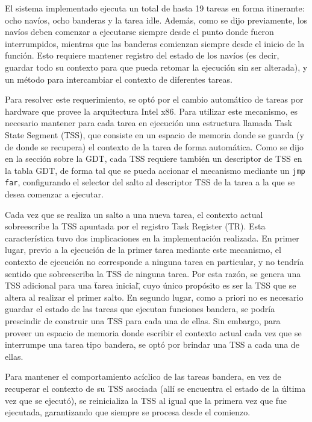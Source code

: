 	El sistema implementado ejecuta un total de hasta 19 tareas en forma itinerante: 
ocho navíos, ocho banderas y la tarea idle. Además, como se dijo previamente, 
los navíos deben comenzar a ejecutarse siempre desde el punto donde fueron interrumpidos, 
mientras que las banderas comienzan siempre desde el inicio de la función. Esto requiere 
mantener registro del estado de los navíos (es decir, guardar todo su contexto para que 
pueda retomar la ejecución sin ser alterada), y un método para intercambiar el contexto 
de diferentes tareas.

	Para resolver este requerimiento, se optó por el cambio automático 
de tareas por hardware que provee la arquitectura Intel x86. Para utilizar este mecanismo, 
es necesario mantener para cada tarea en ejecución una estructura llamada Task State 
Segment (TSS), que consiste en un espacio de memoria donde se guarda (y de donde se 
recupera) el contexto de la tarea de forma automática. Como se dijo en la sección sobre la GDT, 
cada TSS requiere también un descriptor de TSS en la tabla GDT, de forma tal que se pueda 
accionar el mecanismo mediante un \texttt{jmp far}, configurando el selector del salto 
al descriptor TSS de la tarea a la que se desea comenzar a ejecutar.

	Cada vez que se realiza un salto a una nueva tarea, el contexto actual sobreescribe 
la TSS apuntada por el registro Task Register (TR). Esta característica tuvo dos implicaciones 
en la implementación realizada. En primer lugar, previo a la ejecución de la primer tarea 
mediante este mecanismo, el contexto de ejecución no corresponde a ninguna tarea en particular, y 
no tendría sentido que sobreescriba la TSS de ninguna tarea. Por esta razón, se genera una 
TSS adicional para una \"tarea inicial\", cuyo único propósito es ser la TSS que se altera 
al realizar el primer salto. En segundo lugar, como a priori no es necesario guardar el estado de las tareas que ejecutan funciones bandera, se podría prescindir de construir una TSS para cada 
una de ellas. Sin embargo, para proveer un espacio de memoria donde escribir el contexto actual 
cada vez que se interrumpe una tarea tipo bandera, se optó por brindar una TSS a cada una de ellas.

	Para mantener el comportamiento acíclico de las tareas bandera, en vez de recuperar el 
contexto de su TSS asociada (allí se encuentra el estado de la última vez que se ejecutó), se
reinicializa la TSS al igual que la primera vez que fue ejecutada, garantizando que siempre se
procesa desde el comienzo.	
